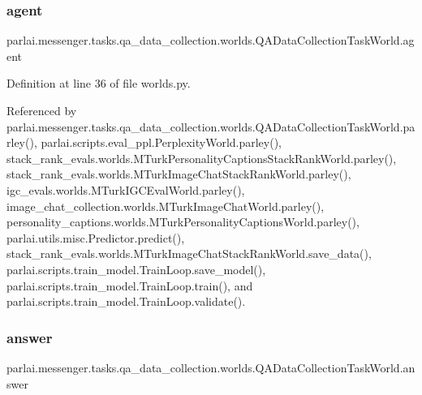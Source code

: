 \subsubsection{\texorpdfstring{agent}{agent}}
{\footnotesize\ttfamily parlai.\+messenger.\+tasks.\+qa\+\_\+data\+\_\+collection.\+worlds.\+Q\+A\+Data\+Collection\+Task\+World.\+agent}



Definition at line 36 of file worlds.\+py.



Referenced by parlai.\+messenger.\+tasks.\+qa\+\_\+data\+\_\+collection.\+worlds.\+Q\+A\+Data\+Collection\+Task\+World.\+parley(), parlai.\+scripts.\+eval\+\_\+ppl.\+Perplexity\+World.\+parley(), stack\+\_\+rank\+\_\+evals.\+worlds.\+M\+Turk\+Personality\+Captions\+Stack\+Rank\+World.\+parley(), stack\+\_\+rank\+\_\+evals.\+worlds.\+M\+Turk\+Image\+Chat\+Stack\+Rank\+World.\+parley(), igc\+\_\+evals.\+worlds.\+M\+Turk\+I\+G\+C\+Eval\+World.\+parley(), image\+\_\+chat\+\_\+collection.\+worlds.\+M\+Turk\+Image\+Chat\+World.\+parley(), personality\+\_\+captions.\+worlds.\+M\+Turk\+Personality\+Captions\+World.\+parley(), parlai.\+utils.\+misc.\+Predictor.\+predict(), stack\+\_\+rank\+\_\+evals.\+worlds.\+M\+Turk\+Image\+Chat\+Stack\+Rank\+World.\+save\+\_\+data(), parlai.\+scripts.\+train\+\_\+model.\+Train\+Loop.\+save\+\_\+model(), parlai.\+scripts.\+train\+\_\+model.\+Train\+Loop.\+train(), and parlai.\+scripts.\+train\+\_\+model.\+Train\+Loop.\+validate().

\mbox{\label{classparlai_1_1messenger_1_1tasks_1_1qa__data__collection_1_1worlds_1_1QADataCollectionTaskWorld_ae1ad373febd7b56249f447204b40e5f4}} 
\subsubsection{\texorpdfstring{answer}{answer}}
{\footnotesize\ttfamily parlai.\+messenger.\+tasks.\+qa\+\_\+data\+\_\+collection.\+worlds.\+Q\+A\+Data\+Collection\+Task\+World.\+answer}



